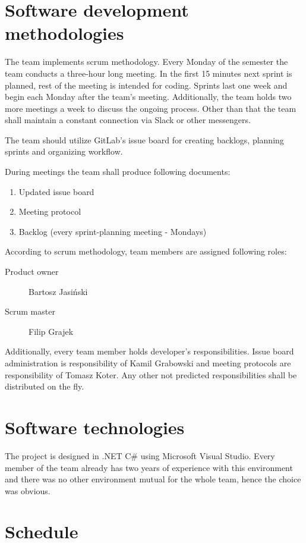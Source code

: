 \documentclass[11pt,a4paper]{article}
\begin{document}
\section{Software development methodologies}
The team implements scrum methodology. Every Monday of the semester the team conducts a three-hour long meeting. In the first 15 minutes next sprint is planned, rest of the meeting is intended for coding. Sprints last one week and begin each Monday after the team's meeting. Additionally, the team holds two more meetings a week to discuss the ongoing process. Other than that the team shall maintain a constant connection via Slack or other messengers.

The team should utilize GitLab's issue board for creating backlogs, planning sprints and organizing workflow.

During meetings the team shall produce following documents:

\begin{enumerate}
\item Updated issue board
\item Meeting protocol
\item Backlog (every sprint-planning meeting - Mondays)
\end{enumerate}

According to scrum methodology, team members are assigned following roles:

\begin{description}
\item[Product owner] Bartosz Jasiński
\item[Scrum master] Filip Grajek
\end{description}

Additionally, every team member holds developer's responsibilities. Issue board administration is responsibility of Kamil Grabowski and meeting protocols are responsibility of Tomasz Koter. Any other not predicted responsibilities shall be distributed on the fly.


\section{Software technologies}
The project is designed in .NET C\# using Microsoft Visual Studio. Every member of the team already has two years of experience with this environment and there was no other environment mutual for the whole team, hence the choice was obvious.



\section{Schedule}
\end{document}
